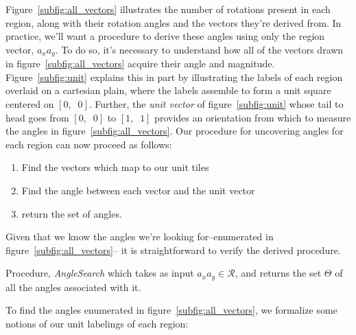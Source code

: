 Figure~\ref{subfig:all_vectors} illustrates the number of rotations present in each
region, along
with their rotation angles and the vectors they're derived from.  In practice, we'll
want a procedure to
derive these angles using only the region vector, $a_xa_y$.  To do so, it's necessary
to understand how
all of the vectors drawn in figure~\ref{subfig:all_vectors} acquire their angle and
magnitude.
Figure~\ref{subfig:unit} explains this in part by
illustrating the labels of each
region overlaid on a
cartesian plain, where the labels assemble to form a unit square centered on
$[0, \;\; 0]$.
Further, the {\it unit vector} of figure~\ref{subfig:unit} whose
tail to head goes from $[0, \;\; 0]$ to $[1, \;\; 1]$
provides an orientation from
which to measure the angles in figure~\ref{subfig:all_vectors}.
  Our procedure for uncovering angles
for each region can now proceed as follows:
\begin{enumerate}
  \item Find the vectors which map to our unit tiles
  \item Find the angle between each vector and the unit vector
  \item return the set of angles.
\end{enumerate}
Given that we know the angles we're looking for--enumerated in figure~\ref{subfig:all_vectors}--
it is straightforward to verify the derived procedure.
\begin{algorithm}[hb]
  \setcounter{AlgoLine}{0}
  \caption{Procedure, {\it AngleSearch} which takes as input $a_xa_y \in \mathcal{R}$,
  and returns the set $\Theta$ of all the angles associated with it.}
  \label{alg:angle_search}
\end{algorithm}
To find the angles enumerated in figure~\ref{subfig:all_vectors},
we formalize some notions of our unit labelings of each region:
